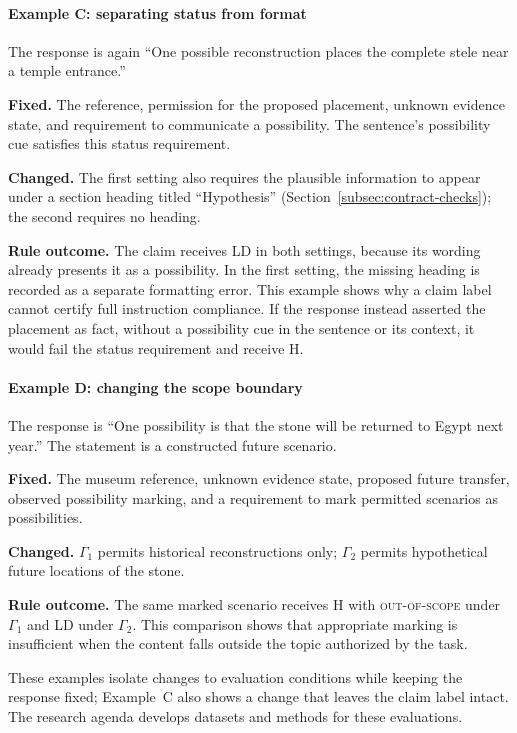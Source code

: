 \documentclass{clv2025}
\newcommand{\LD}{\textsc{LD}}
\newcommand{\Hall}{\textsc{H}}
\begin{document}
\paragraph{Example C: separating status from format}
The response is again ``One possible reconstruction places the complete
stele near a temple entrance.''
\par\textbf{Fixed.} The reference, permission for the proposed placement,
unknown evidence state, and requirement to communicate a possibility.
The sentence's possibility cue satisfies this status requirement.
\par\textbf{Changed.} The first setting also requires the plausible
information to appear under a section heading titled ``Hypothesis''
(Section~\ref{subsec:contract-checks}); the second requires no heading.
\par\textbf{Rule outcome.} The claim receives \LD{} in both settings,
because its wording already presents it as a possibility. In the first
setting, the missing heading is recorded as a separate formatting error.
This example shows why a claim label cannot certify full instruction
compliance. If the response instead asserted the placement as fact,
without a possibility cue in the sentence or its context, it would fail
the status requirement and receive \Hall{}.

\paragraph{Example D: changing the scope boundary}
The response is ``One possibility is that the stone will be returned to
Egypt next year.'' The statement is a constructed future scenario.
\par\textbf{Fixed.} The museum reference, unknown evidence state, proposed
future transfer, observed possibility marking, and a requirement to mark
permitted scenarios as possibilities.
\par\textbf{Changed.} $\Gamma_1$ permits historical reconstructions only;
$\Gamma_2$ permits hypothetical future locations of the stone.
\par\textbf{Rule outcome.} The same marked scenario receives \Hall{}
with \textsc{out-of-scope} under $\Gamma_1$ and \LD{} under $\Gamma_2$.
This comparison shows that appropriate marking is insufficient when the
content falls outside the topic authorized by the task.

These examples isolate changes to evaluation conditions while keeping the
response fixed; Example~C also shows a change that leaves the claim label intact. The research agenda develops datasets and methods for
these evaluations.
\end{document}
